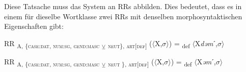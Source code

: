\begin{table}
\caption{Flexion des bestimmten Artikels in Jaun \citep[282]{Stucki1917}}\label{table4.6}
\end{table}

Diese Tatsache muss das System an RRs abbilden. Dies bedeutet, dass es in einem  für dieselbe Wortklasse zwei RRs mit denselben morphosyntaktischen Eigenschaften gibt:

\ea%
    \label{ex:key:27}
RR \textsubscript{A, \{\textsc{case:dat}, \textsc{num:sg}, \textsc{gend:masc}} \textsubscript{${\veebar}$}\textsubscript{ \textsc{neut}\}, \textsc{art[def]}} ($\langle$X,$\sigma$$\rangle$) = \textsubscript{def} $\langle$X\textit{dəm}ˊ,$\sigma$$\rangle$
\z

\ea%
    \label{ex:key:28}
RR \textsubscript{A, \{\textsc{case:dat}, \textsc{num:sg}, \textsc{gend:masc}} \textsubscript{${\veebar}$}\textsubscript{ \textsc{neut} \}, \textsc{art[def]}} ($\langle$X,$\sigma$$\rangle$) = \textsubscript{def} $\langle$X\textit{əm}ˊ,$\sigma$$\rangle$
    \z



